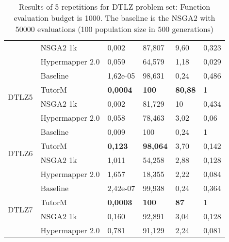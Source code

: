 \begin{table}[]
{\begin{tabular}{@{}llllll@{}}
    & NSGA2 1k        & 0,002           & 87,807          & 9,60           & 0,323 \\ \cmidrule(l){2-6} 
    & Hypermapper 2.0 & 0,059           & 64,579          & 1,18           & 0,029 \\ \midrule
\multirow{4}{*}{DTLZ5} & Baseline       & 1,62e-05        & 98,631          & 0,24           & 0,486 \\ \cmidrule(l){2-6} 
    & TutorM          & \textbf{0,0004} & \textbf{100}    & \textbf{80,88} & 1     \\ \cmidrule(l){2-6} 
    & NSGA2 1k        & 0,002           & 81,729          & 10          & 0,434 \\ \cmidrule(l){2-6} 
    & Hypermapper 2.0 & 0,058           & 78,463          & 3,02           & 0,06 \\ \midrule
\multirow{4}{*}{DTLZ6} & Baseline       & 0,009           & 100             & 0,24           & 1     \\ \cmidrule(l){2-6} 
    & TutorM          & \textbf{0,123}  & \textbf{98,064} & 3,70           & 0,142 \\ \cmidrule(l){2-6} 
    & NSGA2 1k        & 1,011           & 54,258          & 2,88           & 0,128 \\ \cmidrule(l){2-6} 
    & Hypermapper 2.0 & 1,657           & 18,355          & 2,22           & 0,084 \\ \midrule
\multirow{4}{*}{DTLZ7} & Baseline       & 2,42e-07        & 99,938          & 0,24           & 0,364 \\ \cmidrule(l){2-6} 
    & TutorM          & \textbf{0,0003} & \textbf{100}    & \textbf{87} & 1     \\ \cmidrule(l){2-6} 
    & NSGA2 1k        & 0,160           & 92,891          & 3,04           & 0,128 \\
    & Hypermapper 2.0 & 0,781           & 91,129          & 2,24           & 0,081 \\ \cmidrule(l){2-6} 
\end{tabular}%
    }
    \caption{Results of 5 repetitions for DTLZ problem set: Function evaluation budget is 1000. The baseline is the NSGA2 with 50000 evaluations (100 population size in 500 generations)}
    \end{table}
